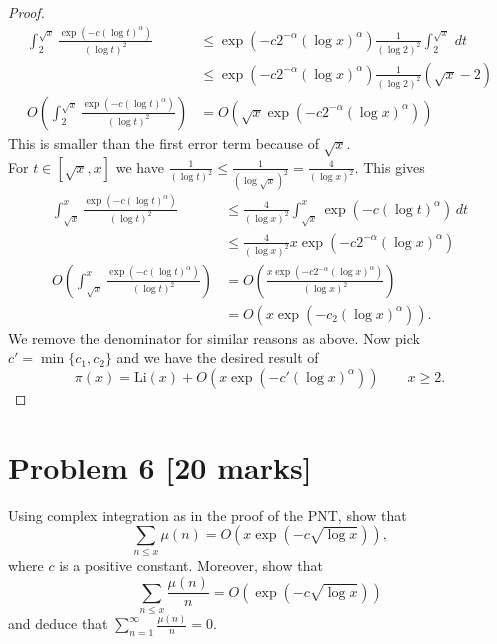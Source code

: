 \documentclass[12pt]{article}
\begin{document}
\begin{proof}
    \begin{align*}
        \int_{2}^{\sqrt{x}}\frac{\exp(-c(\log t)^\alpha)}{(\log t)^2}&\leq\exp(-c2^{-\alpha}(\log x)^\alpha)\frac{1}{(\log 2)^2}\int_{2}^{\sqrt{x}}\,dt\\
        &\leq\exp(-c2^{-\alpha}(\log x)^\alpha)\frac{1}{(\log 2)^2}(\sqrt{x}-2)\\
        O\left(\int_{2}^{\sqrt{x}}\frac{\exp(-c(\log t)^\alpha)}{(\log t)^2}\right)&=O\left(\sqrt{x}\exp(-c2^{-\alpha}(\log x)^\alpha)\right)
    \end{align*}
    This is smaller than the first error term because of $\sqrt{x}$.\\
    For $t\in[\sqrt{x},x]$ we have $\frac{1}{(\log t)^2}\leq\frac{1}{(\log\sqrt{x})^2}=\frac{4}{(\log x)^2}$. This gives
    \begin{align*}
        \int_{\sqrt{x}}^{x}\frac{\exp(-c(\log t)^\alpha)}{(\log t)^2}&\leq\frac{4}{(\log x)^2}\int_{\sqrt{x}}^{x}\exp(-c(\log t)^\alpha)\,dt\\
        &\leq\frac{4}{(\log x)^2}x\exp(-c2^{-\alpha}(\log x)^\alpha)\\
        O\left(\int_{\sqrt{x}}^{x}\frac{\exp(-c(\log t)^\alpha)}{(\log t)^2}\right)&=O\left(\frac{x\exp(-c2^{-\alpha}(\log x)^\alpha)}{(\log x)^2}\right)\\
        &=O\left(x\exp(-c_2(\log x)^\alpha)\right).
    \end{align*}
    We remove the denominator for similar reasons as above. Now pick $c'=\min\{c_1,c_2\}$ and we have the desired result of 
    \[
        \pi(x)=\mathrm{Li}(x)+O\left(x\exp(-c'(\log x)^\alpha)\right)\quad\quad x\geq2.
    \]
\end{proof}
\section*{Problem 6 [20 marks]}   
Using complex integration as in the proof of the PNT, show that 
\[
    \sum_{n\leq x}\mu(n)= O\left(x\exp\left(-c\sqrt{\log x}\right)\right),
\] 
where $c$ is a positive constant. Moreover, show that 
\[
    \sum_{n\leq x}\frac{\mu(n)}{n}= O\left(\exp\left(-c\sqrt{\log x}\right)\right)
\] 
and deduce that $\sum_{n=1}^\infty\frac{\mu(n)}{n}=0$.
\end{document}
